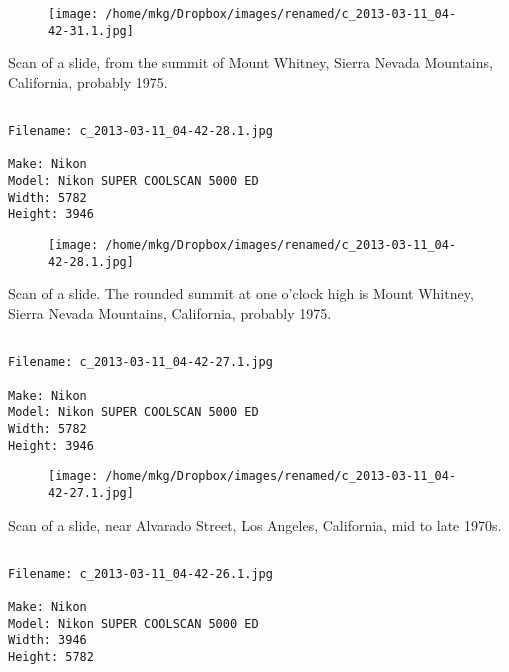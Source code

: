 \begin{figure}
\texttt{[image: /home/mkg/Dropbox/images/renamed/c\_2013-03-11\_04-42-31.1.jpg]}
\end{figure}
    
\clearpage
\onecolumn
\noindent Scan of a slide, from the summit of Mount Whitney, Sierra Nevada Mountains, California, probably 1975.
\noindent
\begin{lstlisting}

Filename: c_2013-03-11_04-42-28.1.jpg

Make: Nikon
Model: Nikon SUPER COOLSCAN 5000 ED
Width: 5782
Height: 3946
\end{lstlisting}
\clearpage

\begin{figure}
\texttt{[image: /home/mkg/Dropbox/images/renamed/c\_2013-03-11\_04-42-28.1.jpg]}
\end{figure}
    
\clearpage
\onecolumn
\noindent Scan of a slide. The rounded summit at one o'clock high is Mount Whitney, Sierra Nevada Mountains, California, probably 1975.
\noindent
\begin{lstlisting}

Filename: c_2013-03-11_04-42-27.1.jpg

Make: Nikon
Model: Nikon SUPER COOLSCAN 5000 ED
Width: 5782
Height: 3946
\end{lstlisting}
\clearpage

\begin{figure}
\texttt{[image: /home/mkg/Dropbox/images/renamed/c\_2013-03-11\_04-42-27.1.jpg]}
\end{figure}
    
\clearpage
\onecolumn
\noindent Scan of a slide, near Alvarado Street, Los Angeles, California, mid to late 1970s.
\noindent
\begin{lstlisting}

Filename: c_2013-03-11_04-42-26.1.jpg

Make: Nikon
Model: Nikon SUPER COOLSCAN 5000 ED
Width: 3946
Height: 5782
\end{lstlisting}
\clearpage

